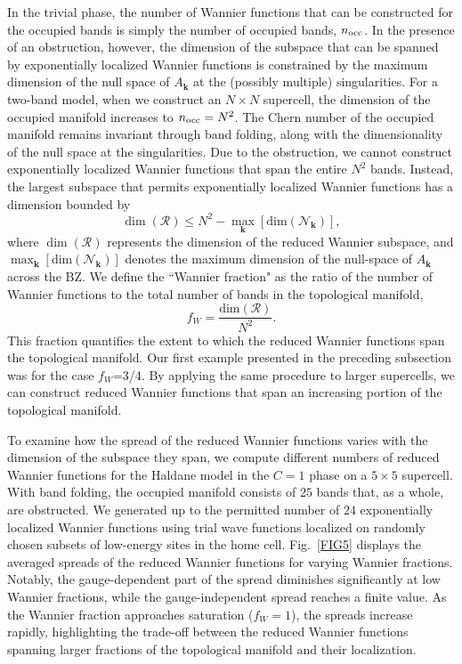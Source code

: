 \documentclass[galley,aps,pra,10pt,amsmath,amssymb,
    superscriptaddress,nofootinbib,longbibliography]{revtex4-2}
\begin{document}
In the trivial phase, the number of Wannier functions that can be constructed for the occupied bands is simply the number of occupied bands, $n_{\rm occ}$. In the presence of an obstruction, however, the dimension of the subspace that can be spanned by exponentially localized Wannier functions is constrained by the maximum dimension of the null space of $A_{\mathbf{k}}$ at the (possibly multiple) singularities. For a two-band model, when we construct an $N\times N$ supercell, the dimension of the occupied manifold increases to $n_{\rm occ} = N^2$. The Chern number of the occupied manifold remains invariant through band folding, along with the dimensionality of the null space at the singularities. Due to the obstruction, we cannot construct exponentially localized Wannier functions that span the entire $N^2$ bands. Instead, the largest subspace that permits exponentially localized Wannier functions has a dimension bounded by
\begin{equation}
    \dim({\mathcal{R}}) \leq N^2 - \max_{\mathbf{k}}\left[ \text{dim}(\mathcal{N}_\mathbf{k}) \right],
\end{equation}
where $ \dim({\mathcal{R}})$ represents the dimension of the reduced Wannier subspace, and $\max_{\mathbf{k}}\left[ \text{dim}(\mathcal{N}_\mathbf{k}) \right]$ denotes the maximum dimension of the null-space of $A_{\mathbf{k}}$ across the BZ. We define the ``Wannier fraction" as the ratio of the number of Wannier functions to the total number of bands in the topological manifold,
\begin{equation}
    f_{W} = \frac{\text{dim}(\mathcal{R})}{N^2}.
\end{equation}
This fraction quantifies the extent to which the reduced Wannier functions span the topological manifold. Our first example presented in the preceding subsection was for the case $f_W$=3/4. By applying the same procedure to larger supercells, we can construct reduced Wannier functions that span an increasing portion of the topological manifold. 

To examine how the spread of the reduced Wannier functions varies with the dimension of the subspace they span, we compute different numbers of reduced Wannier functions for the Haldane model in the $C=1$ phase on a $5\times 5$ supercell. With band folding, the occupied manifold consists of $25$ bands that, as a whole, are obstructed. We generated up to the permitted number of $24$ exponentially localized Wannier functions using trial wave functions localized on randomly chosen subsets of low-energy sites in the home cell. Fig.~\ref{FIG5} displays the averaged spreads of the reduced Wannier functions for varying Wannier fractions. Notably, the gauge-dependent part of the spread diminishes significantly at low Wannier fractions, while the gauge-independent spread reaches a finite value. As the Wannier fraction approaches saturation ($f_W=1$), the spreads increase rapidly, highlighting the trade-off between the reduced Wannier functions spanning larger fractions of the topological manifold and their localization.
\end{document}
